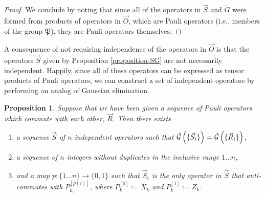 \documentclass[twocolumn,showpacs,preprintnumbers,amsmath,amssymb,nofootinbib,pra,floatfix]{revtex4-1}
\newtheorem{proposition}{Proposition}
\newenvironment{remark}[1][Remark]{\begin{trivlist}
\item[\hskip \labelsep {\bfseries #1}]}{\end{trivlist}}
\newcommand{\lst}{\vec}
\newcommand{\set}{\tilde}
\newcommand{\genfun}{\tilde{\mathcal{G}}}
\newcommand{\pauligroup}{\mathfrak{P}}
\begin{document}
\begin{proof}
We conclude by noting that since all of the operators in $\lst S$ and $\set G$ were formed from products of operators in $\lst O$, which are Pauli operators (i.e., members of the group $\pauligroup$), they are Pauli operators themselves.
\end{proof}
\begin{remark}
A consequence of not requiring independence of the operators in $\lst O$ is that the operators $\lst S$ given by Proposition \ref{proposition-SG} are not necessarily independent.  Happily, since all of these operators can be expressed as tensor products of Pauli operators, we can construct a set of independent operators by performing an analog of Gaussian elimination.
\end{remark}

\begin{proposition}
\label{make-independent-using-elimination}
Suppose that we have been given a sequence of Pauli operators which commute with each other, $\lst R$.  Then there exists
\begin{enumerate}
\item a sequence $\lst S$ of $n$ independent operators such that $\genfun\paren{\{\lst S_i\}}=\genfun\paren{\{\lst R_i\}}$,
\item a sequence of $n$ integers without duplicates in the inclusive range $1\dots n$,
\item and a map $p:\{1\dots n\} \to \{0,1\}$ such that $\lst S_i$ is the only operator in $\lst S$ that anti-commutes with $P_{k_i}^{[p(i)]}$, where $P_k^{[0]}:=X_k$ and $P_k^{[1]}:=Z_k$.
\end{enumerate}
\end{proposition}
\end{document}
